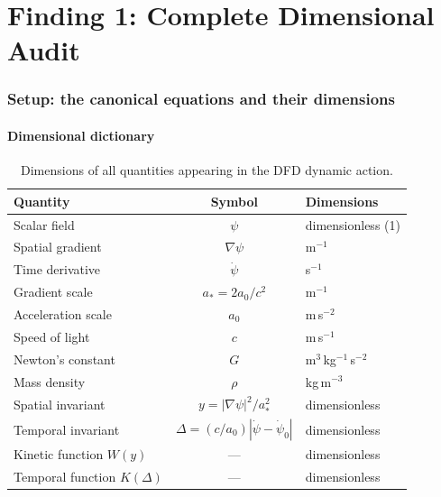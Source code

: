 \documentclass[11pt]{article}
\begin{document}
\newpage

\part{Finding 1: Complete Dimensional Audit}
\label{part:audit}

\section{Setup: the canonical equations and their dimensions}

\subsection{Dimensional dictionary}

\begin{table}[H]
\centering
\caption{Dimensions of all quantities appearing in the DFD dynamic action.}
\label{tab:dims}
\begin{tabular}{@{}lcl@{}}
\toprule
Quantity & Symbol & Dimensions \\
\midrule
Scalar field & $\psi$ & dimensionless (1) \\
Spatial gradient & $\nabla\psi$ & m$^{-1}$ \\
Time derivative & $\dot\psi$ & s$^{-1}$ \\
Gradient scale & $a_* = 2a_0/c^2$ & m$^{-1}$ \\
Acceleration scale & $a_0$ & m\,s$^{-2}$ \\
Speed of light & $c$ & m\,s$^{-1}$ \\
Newton's constant & $G$ & m$^3$\,kg$^{-1}$\,s$^{-2}$ \\
Mass density & $\rho$ & kg\,m$^{-3}$ \\
Spatial invariant & $y = |\nabla\psi|^2/a_*^2$ & dimensionless \\
Temporal invariant & $\Delta = (c/a_0)|\dot\psi - \dot\psi_0|$ & dimensionless \\
Kinetic function $W(y)$ & --- & dimensionless \\
Temporal function $K(\Delta)$ & --- & dimensionless \\
\bottomrule
\end{tabular}
\end{table}
\end{document}
